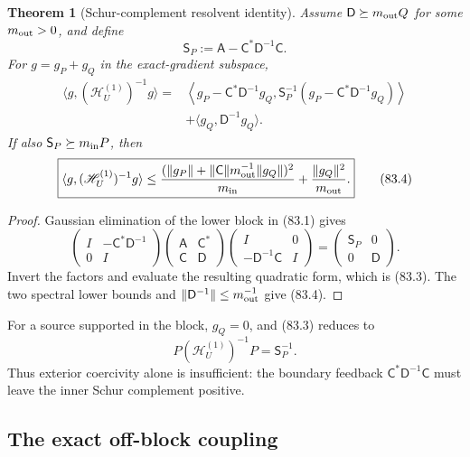\documentclass[11pt]{article}
\newtheorem{theorem}{Theorem}[section]
\theoremstyle{remark}
\begin{document}
\begin{theorem}[Schur-complement resolvent identity]
\label{thm:v17v83-schur}
Assume \(\mathsf D\succeq m_{\rm out}Q\) for some
\(m_{\rm out}>0\), and define
\[
 \mathsf S_P
 :=\mathsf A-\mathsf C^*\mathsf D^{-1}\mathsf C. \tag{83.2}
\]
For \(g=g_P+g_Q\) in the exact-gradient subspace,
\[
\boxed{
\begin{aligned}
 \langle g,(\mathscr H_U^{(1)})^{-1}g\rangle
 ={}&\left\langle
 g_P-\mathsf C^*\mathsf D^{-1}g_Q,
 \mathsf S_P^{-1}
 (g_P-\mathsf C^*\mathsf D^{-1}g_Q)
 \right\rangle\\
 &+\langle g_Q,\mathsf D^{-1}g_Q\rangle .
\end{aligned}}                                    \tag{83.3}
\]
If also \(\mathsf S_P\succeq m_{\rm in}P\), then
\[
\boxed{
 \langle g,(\mathscr H_U^{(1)})^{-1}g\rangle
 \leq
 \frac{(\|g_P\|+\|\mathsf C\|m_{\rm out}^{-1}
              \|g_Q\|)^2}{m_{\rm in}}
 +\frac{\|g_Q\|^2}{m_{\rm out}}.}                \tag{83.4}
\]
\end{theorem}

\begin{proof}
Gaussian elimination of the lower block in (83.1) gives
\[
 \begin{pmatrix}I&-\mathsf C^*\mathsf D^{-1}\\0&I\end{pmatrix}
 \begin{pmatrix}\mathsf A&\mathsf C^*\\
                 \mathsf C&\mathsf D\end{pmatrix}
 \begin{pmatrix}I&0\\-\mathsf D^{-1}\mathsf C&I\end{pmatrix}
 =\begin{pmatrix}\mathsf S_P&0\\0&\mathsf D\end{pmatrix}.     \tag{83.5}
\]
Invert the factors and evaluate the resulting quadratic form, which
is (83.3).  The two spectral lower bounds and
\(\|\mathsf D^{-1}\|\leq m_{\rm out}^{-1}\) give (83.4).
\end{proof}

For a source supported in the block, \(g_Q=0\), and (83.3) reduces to
\[
 P(\mathscr H_U^{(1)})^{-1}P=\mathsf S_P^{-1}.    \tag{83.6}
\]
Thus exterior coercivity alone is insufficient: the boundary feedback
\(\mathsf C^*\mathsf D^{-1}\mathsf C\) must leave the inner Schur
complement positive.

\subsection{The exact off-block coupling}
\end{document}
